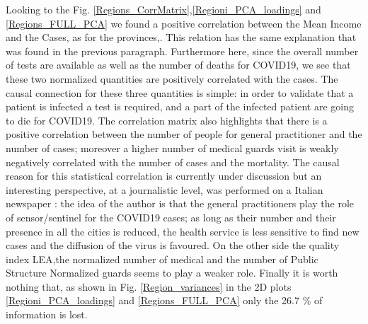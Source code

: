\documentclass[
12pt, %
a4paper, %
oneside, %
headinclude,footinclude, %
BCOR5mm, %
]{scrartcl}
\begin{document}
Looking to the Fig. \ref{Regions_CorrMatrix},\ref{Regioni_PCA_loadings} and \ref{Regions_FULL_PCA} we found a positive correlation between the Mean Income and the Cases, as for the provinces,. This relation has the same explanation that was found in the previous paragraph. Furthermore here, since the overall number of tests are available as well as the number of deaths for COVID19, we see that these two normalized quantities are positively correlated with the cases. The causal connection for these three quantities is simple: in order to validate that a patient is infected a test is required, and a part of the infected patient are going to die for COVID19. The correlation matrix also highlights that there is a positive correlation between the number of people for general practitioner and the number of cases; moreover a higher number of medical guards visit is weakly negatively correlated with the number of cases and the mortality. The causal reason for this statistical correlation is currently under discussion but an interesting perspective, at a journalistic level, was performed on a Italian newspaper \cite{24plus}: the idea of the author is that the general practitioners play the role of sensor/sentinel for the COVID19 cases; as long as their number and their presence in all the cities is reduced, the health service is less sensitive to find new cases and the diffusion of the virus is favoured.  On the other side the quality index LEA,the normalized number of medical and the number of Public Structure Normalized  guards seems to play a weaker role. Finally it is worth nothing that, as shown in Fig. \ref{Region_variances} in the 2D plots \ref{Regioni_PCA_loadings} and \ref{Regions_FULL_PCA} only the 26.7 $ \% $ of information is lost.
\end{document}
